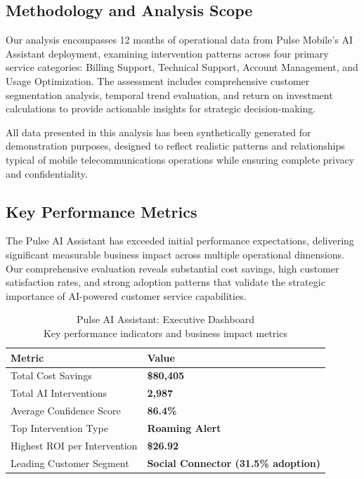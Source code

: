 \documentclass[
  letterpaper,
  DIV=11,
  numbers=noendperiod]{scrartcl}
\begin{document}
\subsection{Methodology and Analysis
Scope}\label{methodology-and-analysis-scope}

Our analysis encompasses 12 months of operational data from Pulse
Mobile's AI Assistant deployment, examining intervention patterns across
four primary service categories: Billing Support, Technical Support,
Account Management, and Usage Optimization. The assessment includes
comprehensive customer segmentation analysis, temporal trend evaluation,
and return on investment calculations to provide actionable insights for
strategic decision-making.

All data presented in this analysis has been synthetically generated for
demonstration purposes, designed to reflect realistic patterns and
relationships typical of mobile telecommunications operations while
ensuring complete privacy and confidentiality.

\subsection{Key Performance Metrics}\label{key-performance-metrics}

The Pulse AI Assistant has exceeded initial performance expectations,
delivering significant measurable business impact across multiple
operational dimensions. Our comprehensive evaluation reveals substantial
cost savings, high customer satisfaction rates, and strong adoption
patterns that validate the strategic importance of AI-powered customer
service capabilities.

\begin{table}
\caption*{
{\large Pulse AI Assistant: Executive Dashboard} \\ 
{\small Key performance indicators and business impact metrics}
} 
\fontsize{12.0pt}{14.4pt}\selectfont
\begin{tabular*}{\linewidth}{@{\extracolsep{\fill}}ll}
\toprule
Metric & Value \\ 
\midrule\addlinespace[2.5pt]
Total Cost Savings & {\bfseries \$80,405} \\ 
Total AI Interventions & {\bfseries 2,987} \\ 
Average Confidence Score & {\bfseries 86.4\%} \\ 
Top Intervention Type & {\bfseries Roaming Alert} \\ 
Highest ROI per Intervention & {\bfseries \$26.92} \\ 
Leading Customer Segment & {\bfseries Social Connector (31.5\% adoption)} \\ 
\bottomrule
\end{tabular*}
\end{table}
\end{document}
